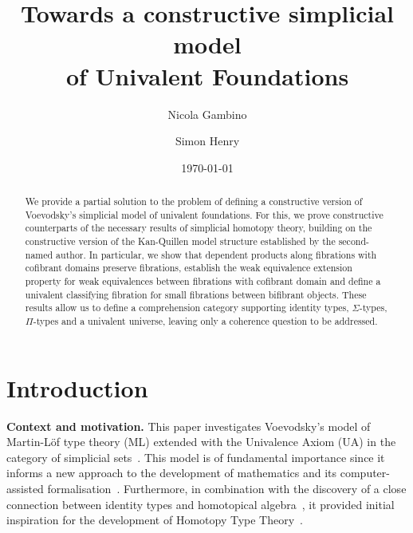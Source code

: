 \documentclass[reqno,10pt,a4paper,oneside,draft]{amsart}
\title[]{Towards a constructive  simplicial model \\ of Univalent Foundations}
\begin{document}
\begin{abstract}
We provide a partial solution to the problem of defining a constructive version of 
Voevodsky's simplicial model of univalent foundations. For this, we prove constructive counterparts of the 
necessary results of simplicial homotopy theory, building on the constructive
version of the Kan-Quillen model structure established by the second-named author. In particular, 
 we show  that dependent products along fibrations with
 cofibrant domains preserve fibrations, establish the weak equivalence extension property
for weak equivalences between fibrations with cofibrant domain and define a univalent 
classifying fibration for small fibrations between bifibrant objects. 
These results allow us to define a comprehension category supporting identity types,
$\Sigma$-types, $\Pi$-types and a univalent universe, leaving only
a coherence question to be addressed.
\end{abstract}

\author{Nicola Gambino}
\address{School of Mathematics, University of Leeds, Leeds LS2 9JT, United Kingdom}


\author{Simon Henry}
\address{Department of Mathematics and Statistics, Masaryk University, Brno, Czeck Republic}


 \date{\today}
 
 

\maketitle



\section*{Introduction} 

\textbf{Context and motivation.} This paper investigates Voevodsky's model of Martin-L\"of type theory (ML)
extended with the Univalence Axiom (UA)  in the category of simplicial sets~\cite{voevodsky-simplicial-model,StreicherT:modtts}.  This model is of fundamental importance since it  informs a new approach to the development 
 of mathematics and its computer-assisted formalisation~\cite{voevodsky:library}. Furthermore, in combination with the discovery of a close connection between identity types and homotopical algebra~\cite{awodey-warren:homotopy-idtype,gambino-garner:idtypewfs}, it provided initial inspiration for the development of  Homotopy Type Theory~\cite{hottbook}.
\end{document}
